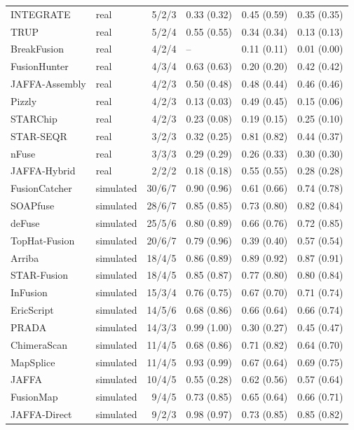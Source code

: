 {\begin{longtable}{llrlll}
INTEGRATE & real & 5/2/3 & 0.33 (0.32) & 0.45 (0.59) & 0.35 (0.35) \\
TRUP & real & 5/2/4 & 0.55 (0.55) & 0.34 (0.34) & 0.13 (0.13) \\
BreakFusion & real & 4/2/4 & -- & 0.11 (0.11) & 0.01 (0.00) \\
FusionHunter & real & 4/3/4 & 0.63 (0.63) & 0.20 (0.20) & 0.42 (0.42) \\
JAFFA-Assembly & real & 4/2/3 & 0.50 (0.48) & 0.48 (0.44) & 0.46 (0.46) \\
Pizzly & real & 4/2/3 & 0.13 (0.03) & 0.49 (0.45) & 0.15 (0.06) \\
STARChip & real & 4/2/3 & 0.23 (0.08) & 0.19 (0.15) & 0.25 (0.10) \\
STAR-SEQR & real & 3/2/3 & 0.32 (0.25) & 0.81 (0.82) & 0.44 (0.37) \\
nFuse & real & 3/3/3 & 0.29 (0.29) & 0.26 (0.33) & 0.30 (0.30) \\
JAFFA-Hybrid & real & 2/2/2 & 0.18 (0.18) & 0.55 (0.55) & 0.28 (0.28) \\
FusionCatcher & simulated & 30/6/7 & 0.90 (0.96) & 0.61 (0.66) & 0.74 (0.78) \\
SOAPfuse & simulated & 28/6/7 & 0.85 (0.85) & 0.73 (0.80) & 0.82 (0.84) \\
deFuse & simulated & 25/5/6 & 0.80 (0.89) & 0.66 (0.76) & 0.72 (0.85) \\
TopHat-Fusion & simulated & 20/6/7 & 0.79 (0.96) & 0.39 (0.40) & 0.57 (0.54) \\
Arriba & simulated & 18/4/5 & 0.86 (0.89) & 0.89 (0.92) & 0.87 (0.91) \\
STAR-Fusion & simulated & 18/4/5 & 0.85 (0.87) & 0.77 (0.80) & 0.80 (0.84) \\
InFusion & simulated & 15/3/4 & 0.76 (0.75) & 0.67 (0.70) & 0.71 (0.74) \\
EricScript & simulated & 14/5/6 & 0.68 (0.86) & 0.66 (0.64) & 0.66 (0.74) \\
PRADA & simulated & 14/3/3 & 0.99 (1.00) & 0.30 (0.27) & 0.45 (0.47) \\
ChimeraScan & simulated & 11/4/5 & 0.68 (0.86) & 0.71 (0.82) & 0.64 (0.70) \\
MapSplice & simulated & 11/4/5 & 0.93 (0.99) & 0.67 (0.64) & 0.69 (0.75) \\
JAFFA & simulated & 10/4/5 & 0.55 (0.28) & 0.62 (0.56) & 0.57 (0.64) \\
FusionMap & simulated & 9/4/5 & 0.73 (0.85) & 0.65 (0.64) & 0.66 (0.71) \\
JAFFA-Direct & simulated & 9/2/3 & 0.98 (0.97) & 0.73 (0.85) & 0.85 (0.82) \\

\end{longtable}}
